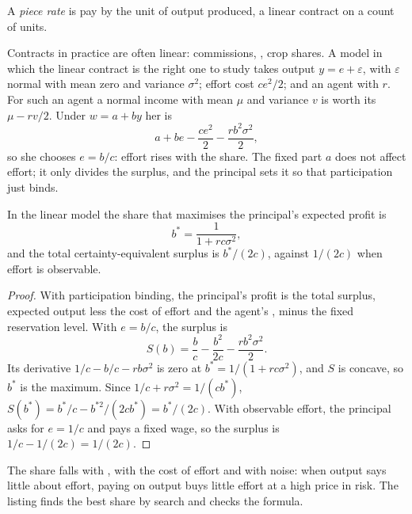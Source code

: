 \begin{definition}\label{def:b2:moral-hazard:piece-rate}
A \emph{piece rate} is pay by the unit of output produced, a linear contract on a count of units.
\end{definition}

Contracts in practice are often linear: commissions, , crop shares. A model in which the linear contract is
the right one to study takes output $y = e + \varepsilon$, with $\varepsilon$ normal with mean zero and variance $\sigma^2$; effort cost $ce^2/2$; and an agent
with  $r$. For such an agent a normal income with mean $\mu$ and variance $v$ is worth its
 $\mu - rv/2$. Under $w = a + by$ her  is
\[
  a + be - \frac{c e^2}{2} - \frac{r b^2 \sigma^2}{2},
\]
so she chooses $e = b/c$: effort rises with the share. The fixed part $a$ does not affect effort; it only divides the surplus,
and the principal sets it so that participation just binds.

\begin{proposition}\label{prop:b2:moral-hazard:linear}
In the linear model the share that maximises the principal's expected profit is
\[
  b^* = \frac{1}{1 + rc\sigma^2},
\]
and the total certainty-equivalent surplus is $b^*/(2c)$, against $1/(2c)$ when effort is observable.
\end{proposition}

\begin{proof}
With participation binding, the principal's profit is the total surplus, expected output less the cost of effort and the
agent's , minus the fixed reservation level. With $e = b/c$, the surplus is
\[
  S(b) = \frac{b}{c} - \frac{b^2}{2c} - \frac{r b^2\sigma^2}{2}.
\]
Its derivative $1/c - b/c - rb\sigma^2$ is zero at $b^* = 1/(1 + rc\sigma^2)$, and $S$ is concave, so $b^*$ is the maximum. Since $1/c + r\sigma^2 = 1/(cb^*)$, $S(b^*) =
b^*/c - b^{*2}/(2cb^*) = b^*/(2c)$. With observable effort, the principal asks for $e = 1/c$ and pays a fixed wage, so the surplus is
$1/c - 1/(2c) = 1/(2c)$.
\end{proof}

The share falls with , with the cost of effort and with noise: when output says little about effort, paying
on output buys little effort at a high price in risk. The listing finds the best share by search and checks the formula.

